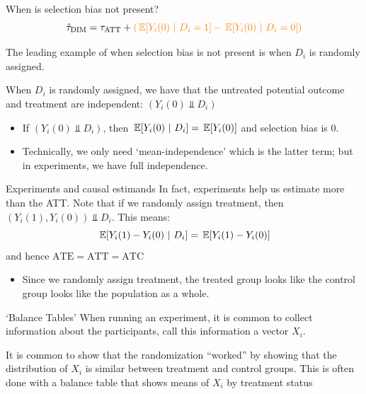 \documentclass[aspectratio=169,t,11pt,table]{beamer}
\begin{document}
\begin{frame}{When is selection bias not present?}
  \vspace*{-\bigskipamount}
  $$
    \hat{\tau}_{\text{DIM}} = \tau_{\text{ATT}} + {\color{orange} \left( \expec{Y_{i}(0)}{D_i = 1} - \expec{Y_{i}(0)}{D_i = 0} \right) }
  $$

  \bigskip
  The leading example of when selection bias is not present is when $D_i$ is randomly assigned.
  
  \pause
  \bigskip
  When $D_i$ is randomly assigned, we have that the untreated potential outcome and treatment are independent: $(Y_i(0) \Perp D_i)$
  \begin{itemize}
    \item If $(Y_i(0) \Perp D_i)$, then $\expec{Y_{i}(0)}{D_i} = \expec{Y_{i}(0)}$ and selection bias is 0.

    \pause 
    \item Technically, we only need `mean-independence' which is the latter term; but in experiments, we have full independence.
  \end{itemize}
\end{frame}

\begin{frame}{Experiments and causal estimands}
  In fact, experiments help us estimate more than the ATT. Note that if we randomly assign treatment, then $(Y_i(1), Y_i(0)) \Perp D_i$. This means: 
  $$
    \expec{Y_i(1) - Y_i(0)}{D_i} = \expec{Y_i(1) - Y_i(0)}
  $$
  and hence $\text{ATE} = \text{ATT} = \text{ATC}$

  \begin{itemize}
    \item Since we randomly assign treatment, the treated group looks like the control group looks like the population as a whole.
  \end{itemize}
\end{frame}

\begin{frame}{`Balance Tables'}
  When running an experiment, it is common to collect information about the participants, call this information a vector $X_i$.

  \bigskip
  It is common to show that the randomization ``worked'' by showing that the distribution of $X_i$ is similar between treatment and control groups. 
  This is often done with a \alert{balance table} that shows means of $X_i$ by treatment status
\end{frame}
\end{document}

